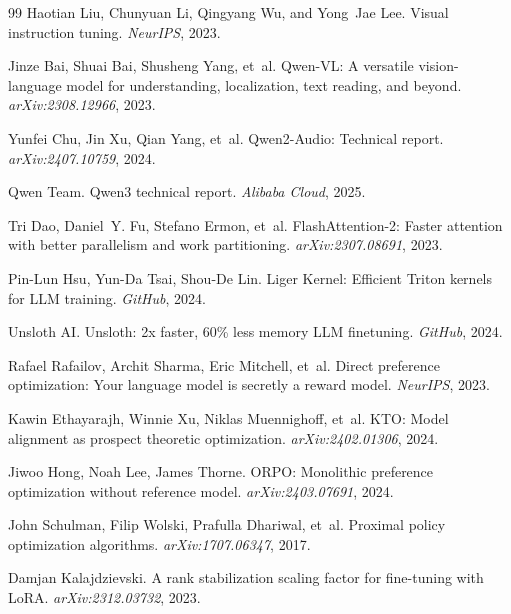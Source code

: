 \begin{thebibliography}{99}
Haotian Liu, Chunyuan Li, Qingyang Wu, and Yong~Jae Lee.
\newblock Visual instruction tuning.
\newblock \emph{NeurIPS}, 2023.

Jinze Bai, Shuai Bai, Shusheng Yang, et~al.
\newblock Qwen-VL: A versatile vision-language model for understanding, localization, text reading, and beyond.
\newblock \emph{arXiv:2308.12966}, 2023.

Yunfei Chu, Jin Xu, Qian Yang, et~al.
\newblock Qwen2-Audio: Technical report.
\newblock \emph{arXiv:2407.10759}, 2024.

Qwen Team.
\newblock Qwen3 technical report.
\newblock \emph{Alibaba Cloud}, 2025.

Tri Dao, Daniel~Y. Fu, Stefano Ermon, et~al.
\newblock FlashAttention-2: Faster attention with better parallelism and work partitioning.
\newblock \emph{arXiv:2307.08691}, 2023.

Pin-Lun Hsu, Yun-Da Tsai, Shou-De Lin.
\newblock Liger Kernel: Efficient Triton kernels for LLM training.
\newblock \emph{GitHub}, 2024.

Unsloth AI.
\newblock Unsloth: 2x faster, 60\% less memory LLM finetuning.
\newblock \emph{GitHub}, 2024.

Rafael Rafailov, Archit Sharma, Eric Mitchell, et~al.
\newblock Direct preference optimization: Your language model is secretly a reward model.
\newblock \emph{NeurIPS}, 2023.

Kawin Ethayarajh, Winnie Xu, Niklas Muennighoff, et~al.
\newblock KTO: Model alignment as prospect theoretic optimization.
\newblock \emph{arXiv:2402.01306}, 2024.

Jiwoo Hong, Noah Lee, James Thorne.
\newblock ORPO: Monolithic preference optimization without reference model.
\newblock \emph{arXiv:2403.07691}, 2024.

John Schulman, Filip Wolski, Prafulla Dhariwal, et~al.
\newblock Proximal policy optimization algorithms.
\newblock \emph{arXiv:1707.06347}, 2017.

Damjan Kalajdzievski.
\newblock A rank stabilization scaling factor for fine-tuning with LoRA.
\newblock \emph{arXiv:2312.03732}, 2023.


\end{thebibliography}
